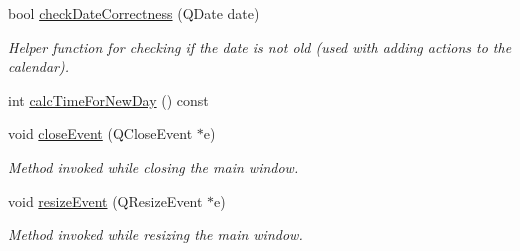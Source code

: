 \begin{DoxyCompactItemize}
bool \hyperlink{classmain_win_a2e729670f337c9017dbfae89c2a1a0a5}{check\-Date\-Correctness} (Q\-Date date)
\begin{DoxyCompactList}\small\item\em Helper function for checking if the date is not old (used with adding actions to the calendar). \end{DoxyCompactList}\item 
int \hyperlink{classmain_win_a63293c7cdab54cf78b86e7c69a3bff7a}{calc\-Time\-For\-New\-Day} () const 
\item 
void \hyperlink{classmain_win_add27401cb9db131bbe76cb9501bdd500}{close\-Event} (Q\-Close\-Event $\ast$e)
\begin{DoxyCompactList}\small\item\em Method invoked while closing the main window. \end{DoxyCompactList}\item 
void \hyperlink{classmain_win_a27498d9d87d3db3601e6af3974686fc9}{resize\-Event} (Q\-Resize\-Event $\ast$e)
\begin{DoxyCompactList}\small\item\em Method invoked while resizing the main window. \end{DoxyCompactList}\end{DoxyCompactItemize}
